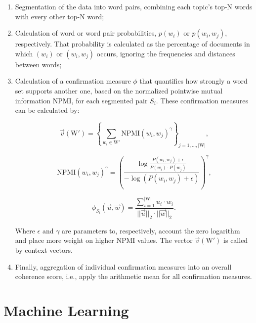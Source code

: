 	\begin{enumerate}
		\item Segmentation of the data into word pairs, combining each topic's top-N words with every other top-N word;
		
		\item Calculation of word or word pair probabilities, $p(w_{i})$ or $p(w_{i}, w_{j})$, respectively. That probability is calculated as the percentage of documents in which $(w_{i})$ or $(w_{i},w_{j})$ occurs, ignoring the frequencies and distances between words;
		
		\item Calculation of a confirmation measure $\phi$ that quantifies how strongly a word set supports another one, based on the normalized pointwise mutual information $\text{NPMI}$, for each segmented pair $S_{i}$. These confirmation measures can be calculated by:
		
		\begin{equation}
			\vec v (\text{W}') = \left\{ \sum_{w_{i} \in \text{W}'} \text{NPMI} (w_{i}, w_{j})^{\gamma} \right\}_{j=1,...,|\text{W}|} \text{,}
		\end{equation}
	
		\begin{equation}
			\text{NPMI} (w_{i}, w_{j})^{\gamma} = \left( \dfrac{\log \frac{P(w_{i}, w_{j}) + \epsilon}{P(w_{i}) \cdot P(w_{j})} }{- \log (P(w_{i}, w_{j}) + \epsilon) } \right)^{\gamma} \text{,}
		\end{equation}
	
		\begin{equation}
			\phi_{S_{i}}(\vec u , \vec w) = \dfrac{ \sum_{i=1}^{|\text{W}|} u_{i} \cdot w_{i} }{||\vec{u}||_{2} \cdot ||\vec{w}||_{2}} \text{.}
		\end{equation}
	
		Where $\epsilon$ and $\gamma$ are parameters to, respectively, account the zero logarithm and place more weight on higher $\text{NPMI}$ values. The vector $\vec{v}(\text{W}')$ is called by context vectors.
	
		\item Finally, aggregation of individual confirmation measures into an overall coherence score, i.e., apply the arithmetic mean for all confirmation measures.
	\end{enumerate}
	
\section{Machine Learning}
	
